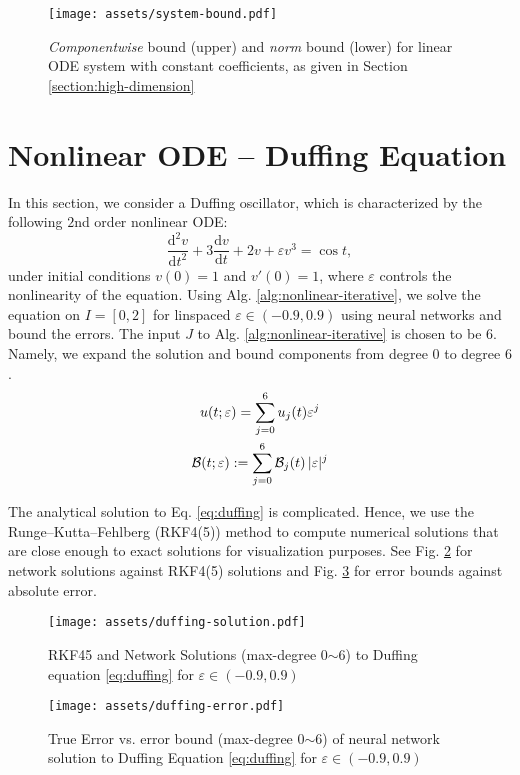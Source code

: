     \makeatletter
    \setlength{\@fptop}{0pt}
    \begin{figure}[!ht]
        \centering
        \texttt{[image: assets/system-bound.pdf]}
        \caption{\textit{Componentwise} bound (upper) and \textit{norm} bound (lower) for linear ODE system with constant coefficients, as given in Section \ref{section:high-dimension}} \label{fig:system-bound}
    \end{figure}
    \makeatother

\section{Nonlinear ODE -- Duffing Equation} \label{section:experiment-duffing}
    In this section, we consider a Duffing oscillator, which is characterized by the following $2$nd order nonlinear ODE:
    {
        \begin{equation}\label{eq:duffing}
            \frac{\mathrm{d}^2 v}{\mathrm{d}t^2} + 3 \frac{\mathrm{d}v}{\mathrm{d}t} + 2v +\varepsilon v^3 = \cos t ,
        \end{equation}
    }
    under initial conditions $v(0) = 1$ and $v'(0) = 1$, where $\varepsilon$ controls the nonlinearity of the equation. 
    Using Alg. \ref{alg:nonlinear-iterative}, we solve the equation on $I=[0, 2]$ for linspaced $\varepsilon \in (-0.9, 0.9)$ using neural networks and bound the errors. 
    The input $J$ to Alg. \ref{alg:nonlinear-iterative} is chosen to be $6$. 
    Namely, we expand the solution and bound components from degree $0$ to degree $6$.
    \begin{gather}
        u(t; \varepsilon) = \sum_{j=0}^{6} u_j(t) \varepsilon^j \\
        \mathcal{B}(t; \varepsilon) := \sum_{j=0}^{6} \mathcal{B}_j(t)\,|\varepsilon|^j 
    \end{gather}

    The analytical solution to Eq. \eqref{eq:duffing} is complicated. 
    Hence, we use the Runge–Kutta–Fehlberg (RKF4(5)) method to compute numerical solutions that are close enough to exact solutions for visualization purposes. 
    See Fig. \ref{fig:duffing-solution} for network solutions against RKF4(5) solutions and Fig. \ref{fig:duffing-error} for error bounds against absolute error.
    \makeatletter
    \setlength{\@fptop}{0pt}
    \begin{figure}[!ht]
        \centering
        \texttt{[image: assets/duffing-solution.pdf]}
        \caption{RKF45 and Network Solutions (max-degree 0$\sim$6) to Duffing equation \eqref{eq:duffing} for $\varepsilon \in (-0.9, 0.9)$}\label{fig:duffing-solution}
    \end{figure}
    \makeatother
    \makeatletter
    \setlength{\@fptop}{0pt}
    \begin{figure}[!ht]
        \centering
        \texttt{[image: assets/duffing-error.pdf]}
        \caption{True Error vs. error bound (max-degree 0$\sim$6) of neural network solution to Duffing Equation \eqref{eq:duffing} for $\varepsilon \in (-0.9, 0.9)$}\label{fig:duffing-error}
    \end{figure}
    \makeatother

